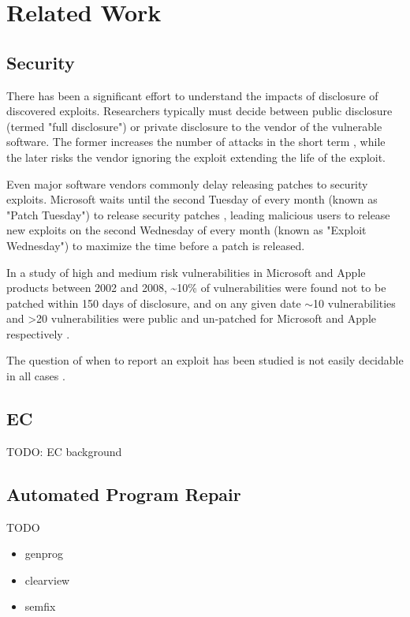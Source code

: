 \documentclass{sigcomm-alternate}
\begin{document}
\section{Related Work}
\label{sec-5}
\subsection{Security}
\label{sec-5-1}
There has been a significant effort to understand the impacts of
disclosure of discovered exploits.  Researchers typically must decide
between public disclosure (termed "full disclosure") or private
disclosure to the vendor of the vulnerable software.  The former
increases the number of attacks in the short term \cite{arora2006does},
while the later risks the vendor ignoring the exploit extending the
life of the exploit.

Even major software vendors commonly delay releasing patches to
security exploits.  Microsoft waits until the second Tuesday of every
month (known as "Patch Tuesday") to release security patches
\cite{lemos2003microsoft}, leading malicious users to release new
exploits on the second Wednesday of every month (known as "Exploit
Wednesday") to maximize the time before a patch is released.

In a study of high and medium risk vulnerabilities in Microsoft and
Apple products between 2002 and 2008, \textasciitilde{}10\% of
vulnerabilities were found not to be patched within 150 days of
disclosure, and on any given date $\sim$10 vulnerabilities and >20
vulnerabilities were public and un-patched for Microsoft and Apple
respectively \cite{frei20080}.

The question of when to report an exploit has been studied is not
easily decidable in all cases \cite{arora2008optimal}.

\subsection{EC}
\label{sec-5-2}

TODO: EC background

\subsection{Automated Program Repair}
\label{sec-5-3}

TODO

\begin{itemize}
\item genprog
\item clearview
\item semfix
\end{itemize}
\end{document}
